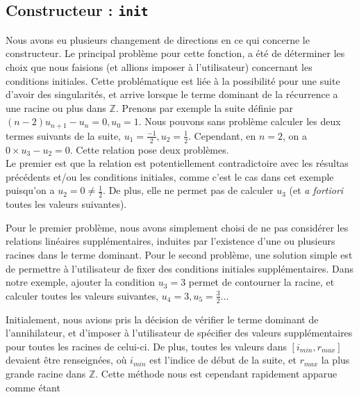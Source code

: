 \documentclass[12pt]{article}
\newlength{\charwidth}
\newcommand{\uline}{\underline{\hspace{2\charwidth}}}
\begin{document}
    \subsection{Constructeur : \texttt{\uline init\uline}}
        \label{sec:cons}
        Nous avons eu plusieurs changement de directions en ce qui concerne le constructeur.
        Le principal problème pour cette fonction, a été de déterminer les choix que nous
        faisions (et allions imposer à l'utilisateur) concernant les conditions initiales.
        Cette problématique est liée à la possibilité pour une suite d'avoir des
        \og singularités\fg, et arrive lorsque le terme dominant de la récurrence 
        a une racine ou plus dans $\mathbb Z$. Prenons par exemple la suite
        définie par $(n-2)u_{n+1} - u_n = 0, u_0 = 1$. Nous pouvons sans problème calculer
        les deux termes suivants de la suite, $u_1 = \frac{-1}{2}, u_2 = \frac{1}{2}$.
        Cependant, en $n=2$, on a $0\times u_3 - u_2=0$. Cette relation pose deux problèmes.\\
        Le premier est que la relation est potentiellement contradictoire avec les
        résultas précédents et/ou les conditions initiales, comme c'est le cas dans cet exemple
        puisqu'on a $u_2=0\ne\frac{1}{2}$. De plus, elle ne permet pas de calculer
        $u_3$ (et \textit{a fortiori} toutes les valeurs suivantes).\\
        \par Pour le premier problème, nous avons simplement choisi de ne pas
        considérer les relations linéaires supplémentaires, induites par l'existence d'une
        ou plusieurs racines dans le terme dominant. Pour le second problème, 
        une solution simple est de permettre à l'utilisateur de fixer des conditions initiales
        supplémentaires. Dans notre exemple, ajouter la condition $u_3 = 3$ permet de
        contourner la racine, et calculer toutes les valeurs suivantes,
        $u_4 = 3,u_5=\frac{3}{2}\ldots$\\
        \par Initialement, nous avions pris la décision de vérifier le terme
        dominant de l'annihilateur, et d'imposer à l'utilisateur de spécifier des 
        valeurs supplémentaires pour toutes les racines de celui-ci. De plus,
        toutes les valeurs dans $[i_{min},r_{max}]$ devaient être renseignées,
        où $i_{min}$ est l'indice de début de la suite, et $r_{max}$ la plus grande racine 
        dans $\mathbb Z$. Cette méthode nous est cependant rapidement apparue comme étant
\end{document}
